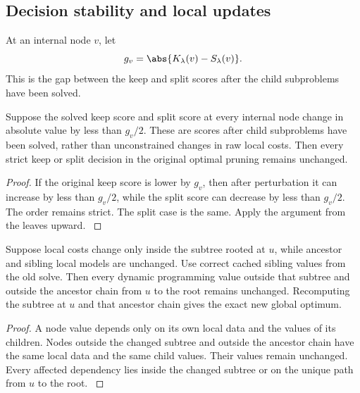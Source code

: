 \subsection{Decision stability and local updates}\label{main:subsection:015}

\begin{definition}\label{main:definition:013}\label{def:decision_gap}
At an internal node \(v\), let
\[
g_v
=
\abs{K_\lambda(v)-S_\lambda(v)}.
\]
This is the gap between the keep and split scores after the child subproblems have been solved.
\end{definition}

\begin{theorem}\label{main:theorem:025}\label{thm:compiler_stability}
Suppose the solved keep score and split score at every internal node change in absolute value by less than $g_v/2$. These are scores after child subproblems have been solved, rather than unconstrained changes in raw local costs. Then every strict keep or split decision in the original optimal pruning remains unchanged.
\end{theorem}

\begin{proof}\label{main:proof:049}
If the original keep score is lower by \(g_v\), then after perturbation it can increase by less than \(g_v/2\), while the split score can decrease by less than \(g_v/2\). The order remains strict. The split case is the same. Apply the argument from the leaves upward.
\label{main:proof:049:end}\end{proof}

\begin{theorem}\label{main:theorem:026}\label{thm:local_recompilation}
Suppose local costs change only inside the subtree rooted at $u$, while ancestor and sibling local models are unchanged. Use correct cached sibling values from the old solve. Then every dynamic programming value outside that subtree and outside the ancestor chain from \(u\) to the root remains unchanged. Recomputing the subtree at \(u\) and that ancestor chain gives the exact new global optimum.
\end{theorem}

\begin{proof}\label{main:proof:050}
A node value depends only on its own local data and the values of its children. Nodes outside the changed subtree and outside the ancestor chain have the same local data and the same child values. Their values remain unchanged. Every affected dependency lies inside the changed subtree or on the unique path from \(u\) to the root.
\label{main:proof:050:end}\end{proof}


